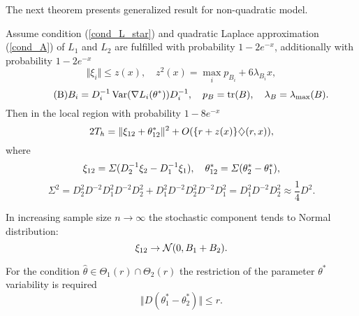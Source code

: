 The next theorem  presents  generalized result for non-quadratic model. 
\begin{theorem}
\label{dl_theorem}
Assume condition (\ref{cond_L_star}) and quadratic Laplace approximation (\ref{cond_A}) of $L_1$ and $L_2$   are fulfilled with probability $1 - 2 e^{-x}$, additionally with probability $1 - 2 e^{-x}$
\[
\Vert \xi_i \Vert \leq z(x), 
\quad z^2(x) = \max_i p_{B_i} + 6 \lambda_{B_i} x,
\] 
\[\tag{B}
B_i = D_i^{-1} \operatorname{Var} (\nabla L_i(\theta^*))D_i^{-1},
\quad p_B = \operatorname{tr}(B), 
\quad \lambda_B  = \lambda_{\max} (B).
\]
Then in the local region with probability $1 - 8 e^{-x}$ 
\[
2 T_h = \Vert  \xi_{12} + \theta_{12}^* \Vert^2  + O(\{r + z(x)\} \diamondsuit (r, x)),
\]
where
\[
\xi_{12}  = \varSigma (D_2^{-1} \xi_2 - D_1^{-1} \xi_1),
\quad
\theta_{12}^*  = \varSigma (\theta_2^* - \theta_1^*),
\]
\[\tag{S}
\Sigma^2 = D_2^2 D^{-2} D_1^2 D^{-2} D_2^2 + D_1^2 D^{-2} D_2^2 D^{-2} D_1^2
 = D_1^2 D^{-2}D_2^2 \approx \frac{1}{4} D^2. 
\]
\end{theorem}    

\begin{remark} 
\label{dxi_limit}
In increasing sample size $n \to \infty$ the stochastic component tends to Normal distribution: 
\[
\xi_{12} \to \mathcal{N}(0, B_1 + B_2).
\]
\end{remark}

\begin{remark}
For the condition $\widehat{\theta} \in \Theta_1(r) \cap \Theta_2(r)$ the restriction of the parameter  $\theta^*$  variability is required
\begin{equation}\label{cond_L_star}
\tag{L*}
\Vert D(\theta_1^* - \theta_2^*) \Vert \leq r.
\end{equation}
\end{remark}

